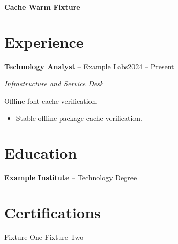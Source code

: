 \documentclass[10pt,a4paper]{article}
\begin{document}
{\LARGE\bfseries Cache Warm Fixture}\par
\section*{Experience}
\textbf{Technology Analyst} -- Example Labs\hfill 2024 -- Present\par
\textit{Infrastructure and Service Desk}\par
{\small Offline font cache verification.}\par
\begin{itemize}
  \item Stable offline package cache verification.
\end{itemize}
\section*{Education}
\textbf{Example Institute} -- Technology Degree\par
\section*{Certifications}
Fixture One \textbullet{} Fixture Two\par
\end{document}
